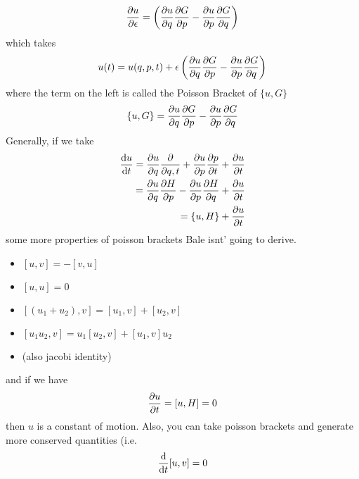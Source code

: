 \documentclass{article} \usepackage{amsmath} \usepackage{amssymb} \usepackage{amsthm} \usepackage[margin=0.2in]{geometry} \usepackage{hyperref} \usepackage{physics} \usepackage{tikz} \usepackage{mathtools} \mathtoolsset{showonlyrefs} \theoremstyle{definition} \newtheorem{theorem}{Theorem}[section] \newtheorem{corollary}{Corollary}[theorem] \newtheorem{lemma}[theorem]{Lemma} \newtheorem{definition}{Definition}[section] \author{Connor Duncan} \date{\today}
\begin{document}
\begin{align} \pdv{u}{\epsilon}=\left(\pdv{u}{q}\pdv{G}{p}-\pdv{u}{p}\pdv{G}{q}\right) \end{align} which takes \begin{equation} u(t)=u(q,p,t)+\epsilon\left(\pdv{u}{q}\pdv{G}{p}-\pdv{u}{p}\pdv{G}{q}\right) \end{equation} where the term on the left is called the Poisson Bracket of $\{u,G\}$ \begin{equation} \{u,G\}=\pdv{u}{q}\pdv{G}{p}-\pdv{u}{p}\pdv{G}{q} \end{equation} Generally, if we take \begin{align} \dv{u}{t}=\pdv{u}{q}\pdv{q,t}+\pdv{u}{p}\pdv{p}{t}+\pdv{u}{t} \\ =\pdv{u}{q}\pdv{H}{p}-\pdv{u}{p}\pdv{H}{q}+\pdv{u}{t} \\ =\{u,H\}+\pdv{u}{t} \end{align} some more properties of poisson brackets Bale isnt' going to derive. \begin{itemize} \item $[u,v]=-[v,u]$ \item $[u,u]=0$ \item $[(u_1+u_2),v]=[u_1,v]+[u_2,v]$ \item $[u_1u_2,v]=u_1[u_2,v]+[u_1,v]u_2$ \item (also jacobi identity) \end{itemize} and if we have \begin{equation} \pdv{u}{t}=[u,H]=0 \end{equation} then $u$ is a constant of motion. Also, you can take poisson brackets and generate more conserved quantities (i.e. \begin{equation} \dv{t}[u,v]=0 \end{equation}
\end{document}
